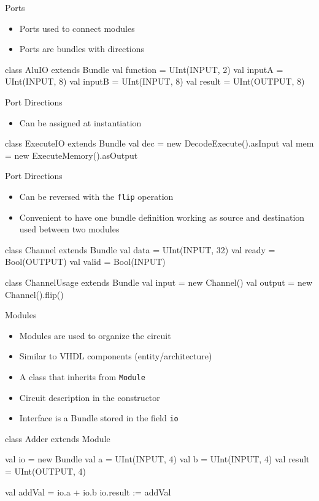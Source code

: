 \documentclass[xcolor=pdflatex,dvipsnames,table]{beamer}
\newcommand{\code}[1]{{\texttt{#1}}}
\begin{document}
\begin{frame}[fragile]{Ports}
\begin{itemize}
\item Ports used to connect modules
\item Ports are bundles with directions
\end{itemize}
\begin{chisel}
class AluIO extends Bundle {
  val function = UInt(INPUT, 2)
  val inputA = UInt(INPUT, 8)
  val inputB = UInt(INPUT, 8)
  val result = UInt(OUTPUT, 8)
}
\end{chisel}
\end{frame}

\begin{frame}[fragile]{Port Directions}
\begin{itemize}
\item Can be assigned at instantiation
\end{itemize}
\begin{chisel}
class ExecuteIO extends Bundle {
  val dec = new DecodeExecute().asInput
  val mem = new ExecuteMemory().asOutput
}
\end{chisel}
\begin{chisel}
\end{chisel}
\end{frame}

\begin{frame}[fragile]{Port Directions}
\begin{itemize}
\item Can be reversed with the \code{flip} operation
\item Convenient to have one bundle definition working as source
and destination used between two modules
\end{itemize}
\begin{chisel}
class Channel extends Bundle {
  val data = UInt(INPUT, 32)
  val ready = Bool(OUTPUT)
  val valid = Bool(INPUT)
}

class ChannelUsage extends Bundle {
  val input = new Channel()
  val output = new Channel().flip()
}
\end{chisel}
\end{frame}

\begin{frame}[fragile]{Modules}
\begin{itemize}
\item Modules are used to organize the circuit
\item Similar to VHDL components (entity/architecture)
\item A class that inherits from \code{Module}
\item Circuit description in the constructor
\item Interface is a Bundle stored in the field \code{io}
\end{itemize}
\begin{chisel}
class Adder extends Module {
  val io = new Bundle {
    val a = UInt(INPUT, 4)
    val b = UInt(INPUT, 4)
    val result = UInt(OUTPUT, 4)
  }

  val addVal = io.a + io.b
  io.result := addVal
}
\end{chisel}
\end{frame}
\end{document}
